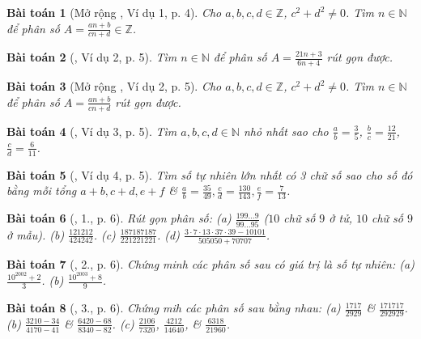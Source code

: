 \documentclass{article}
\newtheorem{baitoan}{Bài toán}
\begin{document}
\begin{baitoan}[Mở rộng \cite{Binh_Toan_6_tap_2}, Ví dụ 1, p. 4]
	Cho $a,b,c,d\in\mathbb{Z}$, $c^2 + d^2\ne0$. Tìm $n\in\mathbb{N}$ để phân số $A = \frac{an + b}{cn + d}\in\mathbb{Z}$.
\end{baitoan}

\begin{baitoan}[\cite{Binh_Toan_6_tap_2}, Ví dụ 2, p. 5]
	Tìm $n\in\mathbb{N}$ để phân số $A = \frac{21n + 3}{6n + 4}$ rút gọn được.
\end{baitoan}

\begin{baitoan}[Mở rộng \cite{Binh_Toan_6_tap_2}, Ví dụ 2, p. 5]
	Cho $a,b,c,d\in\mathbb{Z}$, $c^2 + d^2\ne0$. Tìm $n\in\mathbb{N}$ để phân số $A = \frac{an + b}{cn + d}$ rút gọn được.
\end{baitoan}

\begin{baitoan}[\cite{Binh_Toan_6_tap_2}, Ví dụ 3, p. 5]
	Tìm $a,b,c,d\in\mathbb{N}$ nhỏ nhất sao cho $\frac{a}{b} = \frac{3}{5}$, $\frac{b}{c} = \frac{12}{21}$, $\frac{c}{d} = \frac{6}{11}$.
\end{baitoan}

\begin{baitoan}[\cite{Binh_Toan_6_tap_2}, Ví dụ 4, p. 5]
	Tìm số tự nhiên lớn nhất có 3 chữ số sao cho số đó bằng mỗi tổng $a + b,c + d,e + f$ \& $\frac{a}{b} = \frac{35}{49},\frac{c}{d} = \frac{130}{143},\frac{e}{f} = \frac{7}{13}$.
\end{baitoan}

\begin{baitoan}[\cite{Binh_Toan_6_tap_2}, 1., p. 6]
	Rút gọn phân số: (a) $\frac{199\ldots9}{99\ldots95}$ ($10$ chữ số $9$ ở tử, $10$ chữ số $9$ ở mẫu). (b) $\frac{121212}{424242}$. (c) $\frac{187187187}{221221221}$. (d) $\frac{3\cdot7\cdot13\cdot37\cdot39 - 10101}{505050 + 70707}$.
\end{baitoan}

\begin{baitoan}[\cite{Binh_Toan_6_tap_2}, 2., p. 6]
	Chứng minh các phân số sau có giá trị là số tự nhiên: (a) $\frac{10^{2002} + 2}{3}$. (b) $\frac{10^{2003} + 8}{9}$.
\end{baitoan}

\begin{baitoan}[\cite{Binh_Toan_6_tap_2}, 3., p. 6]
	Chứng mih các phân số sau bằng nhau: (a) $\frac{1717}{2929}$ \& $\frac{171717}{292929}$. (b) $\frac{3210 - 34}{4170 - 41}$ \& $\frac{6420 - 68}{8340 - 82}$. (c) $\frac{2106}{7320}$, $\frac{4212}{14640}$, \& $\frac{6318}{21960}$.
\end{baitoan}
\end{document}
